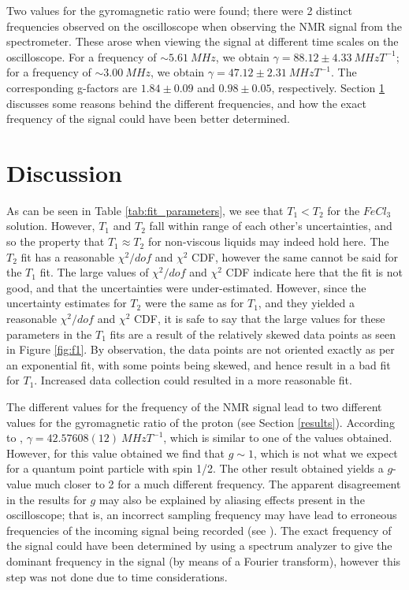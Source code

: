 \documentclass[a4paper, 12pt]{article}  %
\begin{document}
 Two values for the gyromagnetic ratio were found; there were 2 distinct frequencies observed on the oscilloscope when observing the NMR signal from the spectrometer. These arose when viewing the signal at different time scales on the oscilloscope. For a frequency of $\sim 5.61 \ MHz$, we obtain $\gamma = 88.12 \pm 4.33 \ MHzT^{-1}$; for a frequency of $\sim 3.00 \ MHz$, we obtain $\gamma = 47.12 \pm 2.31 \ MHzT^{-1}$. The corresponding g-factors are $1.84 \pm 0.09$ and $0.98 \pm 0.05$, respectively. Section \ref{Discussion} discusses some reasons behind the different frequencies, and how the exact frequency of the signal could have been better determined.
 
 
 


\section{Discussion}\label{Discussion}
As can be seen in Table \ref{tab:fit_parameters}, we see that $T_1 < T_2$ for the $FeCl_3$ solution. However, $T_1$ and $T_2$ fall within range of each other's uncertainties, and so the property that $T_1 \approx T_2$ for non-viscous liquids may indeed hold here. The $T_2$ fit has a reasonable $\chi^2 / dof$ and $\chi^2$ CDF, however the same cannot be said for the $T_1$ fit. The large values of $\chi^2 / dof$ and $\chi^2$ CDF indicate here that the fit is not good, and that the uncertainties were under-estimated. However, since the uncertainty estimates for $T_2$ were the same as for $T_1$, and they yielded a reasonable $\chi^2 / dof$ and $\chi^2$ CDF, it is safe to say that the large values for these parameters in the $T_1$ fits are a result of the relatively skewed data points as seen in Figure \ref{fig:f1}. By observation, the data points are not oriented exactly as per an exponential fit, with some points being skewed, and hence result in a bad fit for $T_1$. Increased data collection could resulted in a more reasonable fit.
\newline

The different values for the frequency of the NMR signal lead to two different values for the gyromagnetic ratio of the proton (see Section \ref{results}). According to \cite{Gyromagnetic_ratio_NIST}, $\gamma =  42.57608(12) \ MHz T^{-1}$, which is similar to one of the values obtained. However, for this value obtained we find that $g \sim 1$, which is not what we expect for a quantum point particle with spin 1/2. The other result obtained yields a $g$-value much closer to 2 for a much different frequency. The apparent disagreement in the results for $g$ may also be explained by aliasing effects present in the oscilloscope; that is, an incorrect sampling frequency may have lead to erroneous frequencies of the incoming signal being recorded (see \cite{aliasing}). The exact frequency of the signal could have been determined by using a spectrum analyzer to give the dominant frequency in the signal (by means of a Fourier transform), however this step was not done due to time considerations. 
\newline
\end{document}
